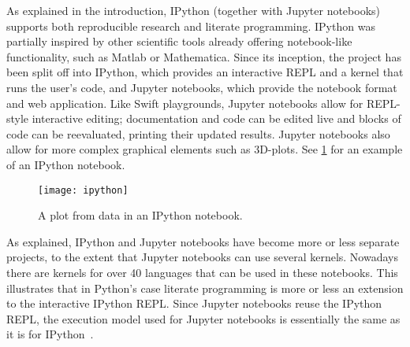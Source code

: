 As explained in the introduction, IPython (together with Jupyter notebooks)
supports both reproducible research and literate programming. IPython was
partially inspired by other scientific tools already offering notebook-like
functionality, such as Matlab or Mathematica. Since its inception, the project
has been split off into IPython, which provides an interactive REPL and a
kernel that runs the user's code, and Jupyter notebooks, which provide the
notebook format and web application. Like Swift playgrounds, Jupyter notebooks
allow for REPL-style interactive editing; documentation and code can be edited
live and blocks of code can be reevaluated, printing their updated results.
Jupyter notebooks also allow for more complex graphical elements such as
3D-plots. See \cref{fig:ipython} for an example of an IPython notebook.

\begin{figure}[htb]
  \centering
  \texttt{[image: ipython]}
  \caption{A plot from data in an IPython notebook.}
  \label{fig:ipython}
\end{figure}

As explained, IPython and Jupyter notebooks have become more or less separate
projects, to the extent that Jupyter notebooks can use several kernels.
Nowadays there are kernels for over 40 languages that can be used in these
notebooks. This illustrates that in Python's case literate programming is more
or less an extension to the interactive IPython REPL. Since Jupyter notebooks
reuse the IPython REPL, the execution model used for Jupyter notebooks is
essentially the same as it is for IPython~\cite{ipython-execution}.

